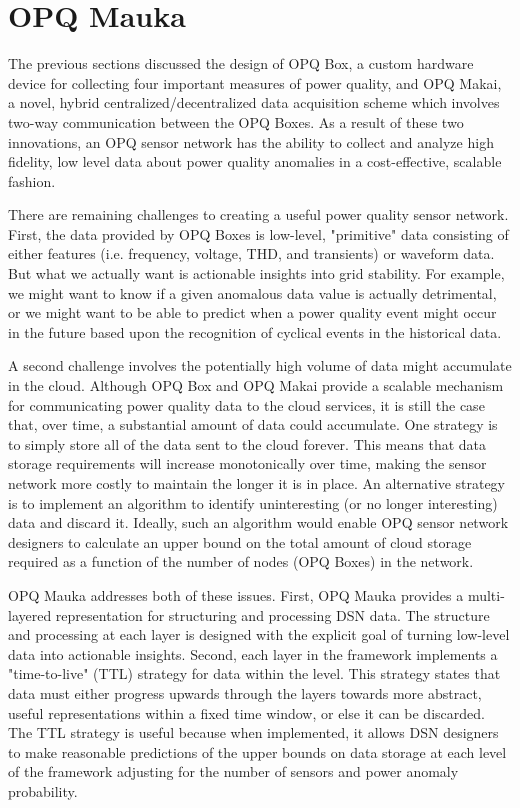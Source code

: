 \section{OPQ Mauka}
\label{sec:opq-mauka}

The previous sections discussed the design of OPQ Box, a custom hardware device for collecting four important measures of power quality, and OPQ Makai, a novel, hybrid centralized/decentralized data acquisition scheme which involves two-way communication between the OPQ Boxes.  As a result of these two innovations, an OPQ sensor network has the ability to collect and analyze high fidelity, low level data about power quality anomalies in a cost-effective, scalable fashion.

There are remaining challenges to creating a useful power quality sensor network. First, the data provided by OPQ Boxes is low-level, "primitive" data consisting of either features (i.e. frequency, voltage, THD, and transients) or waveform data. But what we actually want is actionable insights into grid stability. For example, we might want to know if a given anomalous data value is actually detrimental, or we might want to be able to predict when a power quality event might occur in the future based upon the recognition of cyclical events in the historical data.

A second challenge involves the potentially high volume of data might accumulate in the cloud. Although OPQ Box and OPQ Makai provide a scalable mechanism for communicating power quality data to the cloud services, it is still the case that, over time, a substantial amount of data could accumulate. One strategy is to simply store all of the data sent to the cloud forever. This means that data storage requirements will increase monotonically over time, making the sensor network more costly to maintain the longer it is in place. An alternative strategy is to implement an algorithm to identify uninteresting (or no longer interesting) data and discard it.  Ideally, such an algorithm would enable OPQ sensor network designers to calculate an upper bound on the total amount of cloud storage required as a function of the number of nodes (OPQ Boxes) in the network.

OPQ Mauka addresses both of these issues. First, OPQ Mauka provides a multi-layered representation for structuring and processing DSN data. The structure and processing at each layer is designed with the explicit goal of turning low-level data into actionable insights. Second, each layer in the framework implements a "time-to-live" (TTL) strategy for data within the level. This strategy states that data must either progress upwards through the layers towards more abstract, useful representations within a fixed time window, or else it can be discarded. The TTL strategy is useful because when implemented, it allows DSN designers to make reasonable predictions of the upper bounds on data storage at each level of the framework adjusting for the number of sensors and power anomaly probability.

